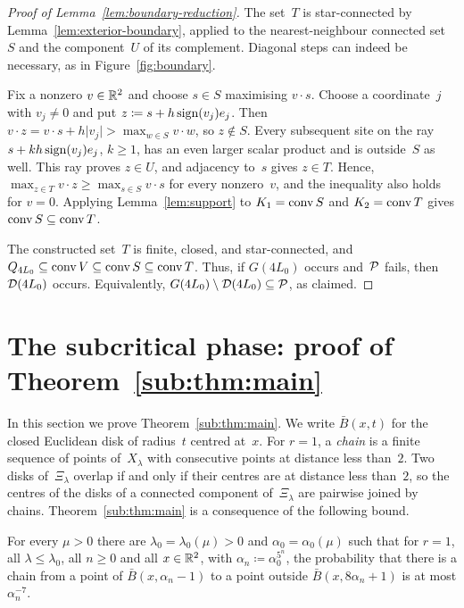 \documentclass[11pt,letterpaper]{article}
\begin{document}
\begin{proof}[Proof of Lemma~\ref{lem:boundary-reduction}]
The set~$T$ is star-connected by Lemma~\ref{lem:exterior-boundary}, applied to the nearest-neighbour connected set~$S$ and the component~$U$ of its complement. Diagonal steps can indeed be necessary, as in Figure~\ref{fig:boundary}.

Fix a nonzero $v\in\mathbb R^2$ and choose $s\in S$ maximising $v\cdot s$. Choose a coordinate~$j$ with $v_j\neq0$ and put $z\coloneqq s+h\operatorname{sign}(v_j)e_j$. Then $v\cdot z=v\cdot s+h\lvert v_j\rvert>\max_{w\in S}v\cdot w$, so $z\notin S$. Every subsequent site on the ray $s+kh\operatorname{sign}(v_j)e_j$, $k\ge1$, has an even larger scalar product and is outside~$S$ as well. This ray proves $z\in U$, and adjacency to~$s$ gives $z\in T$. Hence, $\max_{z\in T}v\cdot z\ge\max_{s\in S}v\cdot s$ for every nonzero~$v$, and the inequality also holds for $v=0$. Applying Lemma~\ref{lem:support} to $K_1=\operatorname{conv} S$ and $K_2=\operatorname{conv} T$ gives $\operatorname{conv} S\subseteq\operatorname{conv} T$.

The constructed set~$T$ is finite, closed, and star-connected, and $Q_{4L_0}\subseteq\operatorname{conv} V\subseteq\operatorname{conv} S\subseteq\operatorname{conv} T$. Thus, if $G(4L_0)$ occurs and~$\mathcal P$ fails, then~$\mathcal D(4L_0)$ occurs. Equivalently, $G(4L_0)\setminus\mathcal D(4L_0)\subseteq\mathcal P$, as claimed.
\end{proof}


\section{The subcritical phase: proof of \texorpdfstring{Theorem~\ref{sub:thm:main}}{the second main theorem}}
\label{sec:subcritical}

In this section we prove Theorem~\ref{sub:thm:main}. We write $\bar B(x,t)$ for the closed Euclidean disk of radius~$t$ centred at~$x$. For $r=1$, a \emph{chain} is a finite sequence of points of~$X_\lambda$ with consecutive points at distance less than~$2$. Two disks of~$\Xi_\lambda$ overlap if and only if their centres are at distance less than~$2$, so the centres of the disks of a connected component of~$\Xi_\lambda$ are pairwise joined by chains. Theorem~\ref{sub:thm:main} is a consequence of the following bound.

\begin{proposition}
\label{sub:prop:chains}
For every $\mu>0$ there are $\lambda_0=\lambda_0(\mu)>0$ and $\alpha_0=\alpha_0(\mu)$ such that for $r=1$, all $\lambda\le\lambda_0$, all $n\ge0$ and all $x\in\mathbb R^2$, with $\alpha_n\coloneqq\alpha_0^{5^n}$, the probability that there is a chain from a point of $\bar B(x,\alpha_n-1)$ to a point outside $\bar B(x,8\alpha_n+1)$ is at most $\alpha_n^{-7}$.
\end{proposition}
\end{document}
